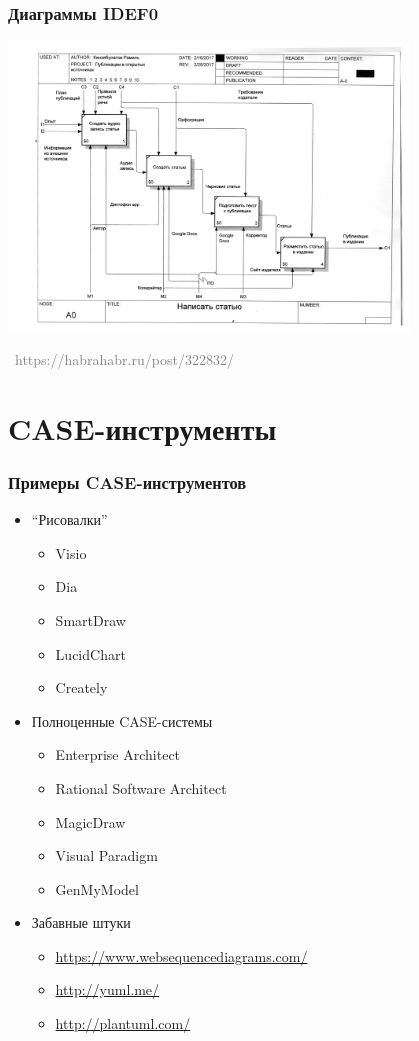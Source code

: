 \documentclass[xetex,mathserif,serif]{beamer}
\newcommand{\attribution}[1] {
	\vspace{-5mm}\begin{flushright}\begin{scriptsize}\textcolor{gray}{\textcopyright\, #1}\end{scriptsize}\end{flushright}
}
\begin{document}
	\begin{frame}
		\frametitle{Диаграммы IDEF0}
		\begin{center}
			\includegraphics[width=0.80\textwidth]{idef0.png}
			\attribution{https://habrahabr.ru/post/322832/}
		\end{center}
	\end{frame}

	\section{CASE-инструменты}

	\begin{frame}
		\frametitle{Примеры CASE-инструментов}
		\begin{itemize}
			\item ``Рисовалки''
			\begin{itemize}
				\item Visio
				\item Dia
				\item SmartDraw
				\item LucidChart
				\item Creately
			\end{itemize}
			\item Полноценные CASE-системы
			\begin{itemize}
				\item Enterprise Architect
				\item Rational Software Architect
				\item MagicDraw
				\item Visual Paradigm
				\item GenMyModel
			\end{itemize}
			\item Забавные штуки
			\begin{itemize}
				\item \url{https://www.websequencediagrams.com/}
				\item \url{http://yuml.me/}
				\item \url{http://plantuml.com/}
			\end{itemize}
		\end{itemize}
	\end{frame}
\end{document}
